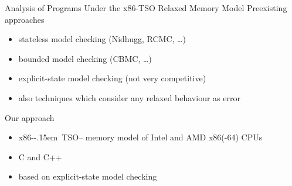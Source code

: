 \documentclass[aspectratio=169, fi]{paradise-slide}
\newcommand{\xtso}{\mbox{x86-\kern-.15em TSO}\xspace}
\begin{document}
\begin{frame}{Analysis of Programs Under the x86-TSO Relaxed Memory Model}
  Preexisting approaches
  \begin{itemize}
    \item stateless model checking (Nidhugg, RCMC, …)
    \item bounded model checking (CBMC, …)
    \item explicit-state model checking (not very competitive)
    \item also techniques which consider any relaxed behaviour as error
  \end{itemize}

  \bigskip
  Our approach
  \begin{itemize}
    \item \xtso – memory model of Intel and AMD x86(-64) CPUs
    \item C and C++
    \item based on explicit-state model checking
  \end{itemize}
\end{frame}
\end{document}
